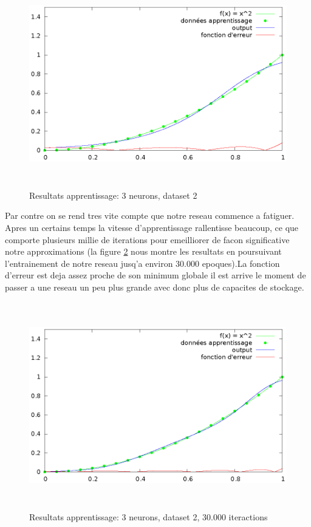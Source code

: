 \documentclass[twoside,openright,a4paper,11pt,french]{article}
\begin{document}
\begin{figure}[ht]
\centering
\includegraphics[width=12cm,height=9cm]{./pics/chartsqtest2.eps}
\caption{Resultats apprentissage: 3 neurons, dataset 2}
\label{fig:chartsqtest2}
\end{figure}

Par contre on se rend tres vite compte que notre reseau commence a fatiguer.
Apres un certains temps la vitesse d'apprentissage rallentisse beaucoup, 
ce que comporte plusieurs millie de iterations pour emeilliorer de facon 
significative notre approximations (la figure \ref{fig:chartsqtest3} nous
montre les resultats en poursuivant l'entrainement de notre reseau jusq'a
environ 30.000 epoques).La fonction d'erreur est deja assez proche de son minimum 
globale il est arrive le moment de passer a une reseau un peu plus grande 
avec donc plus de capacites de stockage.


\begin{figure}[ht]
\centering
\includegraphics[width=12cm,height=9cm]{./pics/chartsqtest3.eps}
\caption{Resultats apprentissage: 3 neurons, dataset 2, 30.000 iteractions}
\label{fig:chartsqtest3}
\end{figure}
\end{document}
